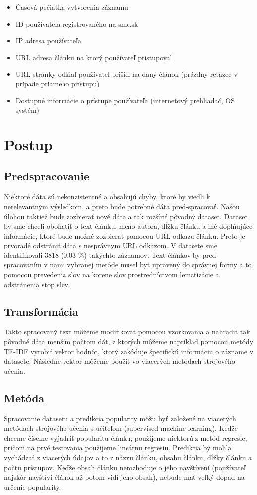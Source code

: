 \documentclass[runningheads,a4paper]{llncs}
\begin{document}
\begin{itemize}
\renewcommand{\labelitemi}{$\bullet$}
  \item Časová pečiatka vytvorenia záznamu
  \item ID používateľa registrovaného na sme.sk
  \item IP adresa používateľa
  \item URL adresa článku na ktorý používateľ pristupoval
  \item URL stránky odkiaľ používateľ prišiel na daný článok (prázdny 
reťazec v prípade priameho prístupu)
  \item Dostupné informácie o prístupe používateľa (internetový prehliadač, OS systém)
\end{itemize}

\section{Postup}
\subsection{Predspracovanie}
Niektoré dáta sú nekonzistentné a obsahujú chyby, ktoré by viedli k 
nerelevantným výsledkom, a preto bude potrebné dáta pred-spracovať. Našou úlohou 
taktiež bude zozbierať nové dáta a tak rozšíriť pôvodný dataset. Dataset by sme 
chceli obohatiť o text článku, meno autora, dĺžku článku a iné doplňujúce 
informácie, ktoré bude možné zozbierať pomocou URL odkazu článku. Preto je 
prvoradé odstrániť dáta s nesprávnym URL odkazom. V datasete 
sme identifikovali 3818 (0,03 \%) takýchto záznamov. Text článkov by pred 
spracovaním v nami vybranej metóde musel byť upravený do správnej formy a to 
pomocou prevedenia slov na korene slov prostredníctvom lematizácie a odstránenia stop slov.

\subsection{Transformácia}
Takto spracovaný text môžeme modifikovať pomocou vzorkovania a nahradiť 
tak pôvodné dáta menším počtom dát, z ktorých môžeme napríklad pomocou metódy 
TF-IDF vyrobiť vektor hodnôt, ktorý zakóduje špecifickú informáciu o zázname v 
datasete. Následne vektor môžeme použiť vo viacerých metódach strojového učenia.

\subsection{Metóda}
Spracovanie datasetu a predikcia popularity môžu byť založené na viacerých 
metódach strojového učenia s učiteľom (supervised machine learning). Kedže 
chceme číselne vyjadriť popularitu článku, použijeme niektorú z metód regresie, 
pričom na prvé testovania použijeme lineárnu regresiu. Predikcia by mohla 
vychádzať z viacerých údajov a to z názvu článku, obsahu článku, dĺžky článku a počtu 
prístupov. Keďže obsah článku nerozhoduje o jeho navštívení (používateľ najskôr 
navštívi článok až potom vidí jeho obsah), nebude mať veľký dopad na určenie 
popularity.
\end{document}

